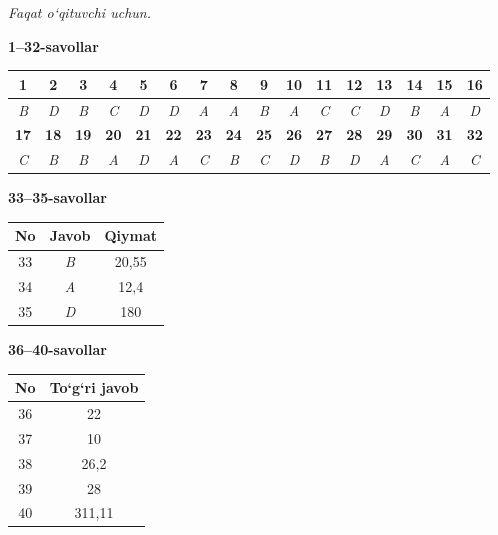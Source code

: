 \documentclass[11pt,a4paper]{article}
\begin{document}
\textit{Faqat o`qituvchi uchun.}\par\medskip
\noindent\textbf{1--32-savollar}\par\smallskip
\noindent\begin{tabular}{|c|c|c|c|c|c|c|c|c|c|c|c|c|c|c|c|}\hline
\textbf{1} & \textbf{2} & \textbf{3} & \textbf{4} & \textbf{5} & \textbf{6} & \textbf{7} & \textbf{8} & \textbf{9} & \textbf{10} & \textbf{11} & \textbf{12} & \textbf{13} & \textbf{14} & \textbf{15} & \textbf{16}\\\hline
\textsl{B} & \textsl{D} & \textsl{B} & \textsl{C} & \textsl{D} & \textsl{D} & \textsl{A} & \textsl{A} & \textsl{B} & \textsl{A} & \textsl{C} & \textsl{C} & \textsl{D} & \textsl{B} & \textsl{A} & \textsl{D}\\\hline
\textbf{17} & \textbf{18} & \textbf{19} & \textbf{20} & \textbf{21} & \textbf{22} & \textbf{23} & \textbf{24} & \textbf{25} & \textbf{26} & \textbf{27} & \textbf{28} & \textbf{29} & \textbf{30} & \textbf{31} & \textbf{32}\\\hline
\textsl{C} & \textsl{B} & \textsl{B} & \textsl{A} & \textsl{D} & \textsl{A} & \textsl{C} & \textsl{B} & \textsl{C} & \textsl{D} & \textsl{B} & \textsl{D} & \textsl{A} & \textsl{C} & \textsl{A} & \textsl{C}\\\hline
\end{tabular}\par\medskip
\noindent\textbf{33--35-savollar}\par\smallskip
\noindent\begin{tabular}{|c|c|c|}\hline \textbf{No} & \textbf{Javob} & \textbf{Qiymat}\\\hline
33 & \textsl{B} & 20,55\\\hline
34 & \textsl{A} & 12,4\\\hline
35 & \textsl{D} & 180\\\hline
\end{tabular}\par\medskip
\noindent\textbf{36--40-savollar}\par\smallskip
\noindent\begin{tabular}{|c|c|}\hline \textbf{No} & \textbf{To`g`ri javob}\\\hline
36 & 22\\\hline
37 & 10\\\hline
38 & 26,2\\\hline
39 & 28\\\hline
40 & 311,11\\\hline
\end{tabular}\par\medskip
\end{document}
